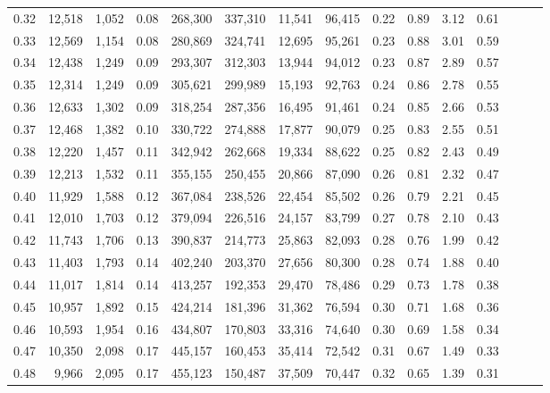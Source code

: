 \begin{tabular}{rrrrrrrrrrrrrrr}
0.32 &  12,518 &  1,052 &  0.08 &  268,300 &  337,310 &   11,541 &   96,415 &  0.22 &  0.89 &  3.12 &      0.61 \\
0.33 &  12,569 &  1,154 &  0.08 &  280,869 &  324,741 &   12,695 &   95,261 &  0.23 &  0.88 &  3.01 &      0.59 \\
0.34 &  12,438 &  1,249 &  0.09 &  293,307 &  312,303 &   13,944 &   94,012 &  0.23 &  0.87 &  2.89 &      0.57 \\
0.35 &  12,314 &  1,249 &  0.09 &  305,621 &  299,989 &   15,193 &   92,763 &  0.24 &  0.86 &  2.78 &      0.55 \\
0.36 &  12,633 &  1,302 &  0.09 &  318,254 &  287,356 &   16,495 &   91,461 &  0.24 &  0.85 &  2.66 &      0.53 \\
0.37 &  12,468 &  1,382 &  0.10 &  330,722 &  274,888 &   17,877 &   90,079 &  0.25 &  0.83 &  2.55 &      0.51 \\
0.38 &  12,220 &  1,457 &  0.11 &  342,942 &  262,668 &   19,334 &   88,622 &  0.25 &  0.82 &  2.43 &      0.49 \\
0.39 &  12,213 &  1,532 &  0.11 &  355,155 &  250,455 &   20,866 &   87,090 &  0.26 &  0.81 &  2.32 &      0.47 \\
0.40 &  11,929 &  1,588 &  0.12 &  367,084 &  238,526 &   22,454 &   85,502 &  0.26 &  0.79 &  2.21 &      0.45 \\
0.41 &  12,010 &  1,703 &  0.12 &  379,094 &  226,516 &   24,157 &   83,799 &  0.27 &  0.78 &  2.10 &      0.43 \\
0.42 &  11,743 &  1,706 &  0.13 &  390,837 &  214,773 &   25,863 &   82,093 &  0.28 &  0.76 &  1.99 &      0.42 \\
0.43 &  11,403 &  1,793 &  0.14 &  402,240 &  203,370 &   27,656 &   80,300 &  0.28 &  0.74 &  1.88 &      0.40 \\
0.44 &  11,017 &  1,814 &  0.14 &  413,257 &  192,353 &   29,470 &   78,486 &  0.29 &  0.73 &  1.78 &      0.38 \\
0.45 &  10,957 &  1,892 &  0.15 &  424,214 &  181,396 &   31,362 &   76,594 &  0.30 &  0.71 &  1.68 &      0.36 \\
0.46 &  10,593 &  1,954 &  0.16 &  434,807 &  170,803 &   33,316 &   74,640 &  0.30 &  0.69 &  1.58 &      0.34 \\
0.47 &  10,350 &  2,098 &  0.17 &  445,157 &  160,453 &   35,414 &   72,542 &  0.31 &  0.67 &  1.49 &      0.33 \\
0.48 &   9,966 &  2,095 &  0.17 &  455,123 &  150,487 &   37,509 &   70,447 &  0.32 &  0.65 &  1.39 &      0.31 \\

\end{tabular}
